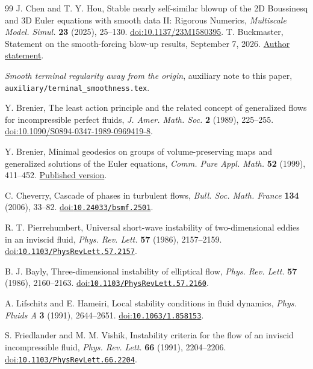 \begin{thebibliography}{99}
 J. Chen and T. Y. Hou,
Stable nearly self-similar blowup of the 2D Boussinesq and 3D Euler
equations with smooth data II: Rigorous Numerics,
\emph{Multiscale Model. Simul.} \textbf{23} (2025), 25--130.
\href{https://doi.org/10.1137/23M1580395}{doi:10.1137/23M1580395}.
 T. Buckmaster,
Statement on the smooth-forcing blow-up results, September 7, 2026.
\href{https://cims.nyu.edu/~tristanb/statement.pdf}{Author statement}.

\emph{Smooth terminal regularity away from the origin}, auxiliary note to
this paper, \nolinkurl{auxiliary/terminal_smoothness.tex}.

 Y. Brenier,
The least action principle and the related concept of generalized flows
for incompressible perfect fluids,
\emph{J. Amer. Math. Soc.} \textbf{2} (1989), 225--255.
\href{https://doi.org/10.1090/S0894-0347-1989-0969419-8}{doi:10.1090/S0894-0347-1989-0969419-8}.

 Y. Brenier,
Minimal geodesics on groups of volume-preserving maps and generalized
solutions of the Euler equations,
\emph{Comm. Pure Appl. Math.} \textbf{52} (1999), 411--452.
\href{https://doi.org/10.1002/(SICI)1097-0312(199904)52:4<411::AID-CPA1>3.0.CO;2-3}{Published version}.

 C. Cheverry,
Cascade of phases in turbulent flows,
\emph{Bull. Soc. Math. France} \textbf{134} (2006), 33--82.
\href{https://doi.org/10.24033/bsmf.2501}{doi:\nolinkurl{10.24033/bsmf.2501}}.

 R. T. Pierrehumbert,
Universal short-wave instability of two-dimensional eddies in an inviscid fluid,
\emph{Phys. Rev. Lett.} \textbf{57} (1986), 2157--2159.
\href{https://doi.org/10.1103/PhysRevLett.57.2157}{doi:\nolinkurl{10.1103/PhysRevLett.57.2157}}.

 B. J. Bayly,
Three-dimensional instability of elliptical flow,
\emph{Phys. Rev. Lett.} \textbf{57} (1986), 2160--2163.
\href{https://doi.org/10.1103/PhysRevLett.57.2160}{doi:\nolinkurl{10.1103/PhysRevLett.57.2160}}.

 A. Lifschitz and E. Hameiri,
Local stability conditions in fluid dynamics,
\emph{Phys. Fluids A} \textbf{3} (1991), 2644--2651.
\href{https://doi.org/10.1063/1.858153}{doi:\nolinkurl{10.1063/1.858153}}.

 S. Friedlander and M. M. Vishik,
Instability criteria for the flow of an inviscid incompressible fluid,
\emph{Phys. Rev. Lett.} \textbf{66} (1991), 2204--2206.
\href{https://doi.org/10.1103/PhysRevLett.66.2204}{doi:\nolinkurl{10.1103/PhysRevLett.66.2204}}.


\end{thebibliography}
